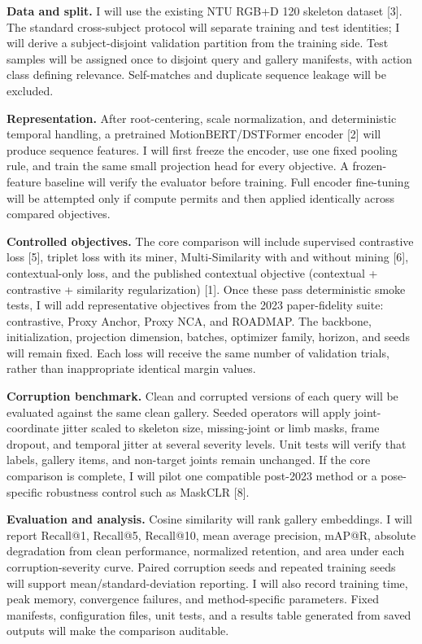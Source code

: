 \documentclass[11pt,letterpaper]{article}
\begin{document}
\textbf{\color{DarkAccent}Data and split.}
I will use the existing NTU RGB+D 120 skeleton dataset [3]. The standard cross-subject protocol will separate training and test identities; I will derive a subject-disjoint validation partition from the training side. Test samples will be assigned once to disjoint query and gallery manifests, with action class defining relevance. Self-matches and duplicate sequence leakage will be excluded.

\textbf{\color{DarkAccent}Representation.}
After root-centering, scale normalization, and deterministic temporal handling, a pretrained MotionBERT/DSTFormer encoder [2] will produce sequence features. I will first freeze the encoder, use one fixed pooling rule, and train the same small projection head for every objective. A frozen-feature baseline will verify the evaluator before training. Full encoder fine-tuning will be attempted only if compute permits and then applied identically across compared objectives.

\textbf{\color{DarkAccent}Controlled objectives.}
The core comparison will include supervised contrastive loss [5], triplet loss with its miner, Multi-Similarity with and without mining [6], contextual-only loss, and the published contextual objective (contextual + contrastive + similarity regularization) [1]. Once these pass deterministic smoke tests, I will add representative objectives from the 2023 paper-fidelity suite: contrastive, Proxy Anchor, Proxy NCA, and ROADMAP. The backbone, initialization, projection dimension, batches, optimizer family, horizon, and seeds will remain fixed. Each loss will receive the same number of validation trials, rather than inappropriate identical margin values.

\textbf{\color{DarkAccent}Corruption benchmark.}
Clean and corrupted versions of each query will be evaluated against the same clean gallery. Seeded operators will apply joint-coordinate jitter scaled to skeleton size, missing-joint or limb masks, frame dropout, and temporal jitter at several severity levels. Unit tests will verify that labels, gallery items, and non-target joints remain unchanged. If the core comparison is complete, I will pilot one compatible post-2023 method or a pose-specific robustness control such as MaskCLR [8].

\textbf{\color{DarkAccent}Evaluation and analysis.}
Cosine similarity will rank gallery embeddings. I will report Recall@1, Recall@5, Recall@10, mean average precision, mAP@R, absolute degradation from clean performance, normalized retention, and area under each corruption-severity curve. Paired corruption seeds and repeated training seeds will support mean/standard-deviation reporting. I will also record training time, peak memory, convergence failures, and method-specific parameters. Fixed manifests, configuration files, unit tests, and a results table generated from saved outputs will make the comparison auditable.
\end{document}
